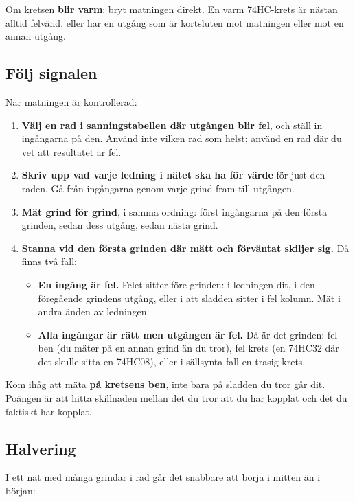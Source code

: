 \begin{warning}
Om kretsen \textbf{blir varm}: bryt matningen direkt. En varm 74HC-krets är nästan alltid felvänd,
eller har en utgång som är kortsluten mot matningen eller mot en annan utgång.
\end{warning}

\subsection{Följ signalen}
\label{c5:a4}
När matningen är kontrollerad:
\begin{enumerate}
  \item \textbf{Välj en rad i sanningstabellen där utgången blir fel}, och ställ in ingångarna på
    den. Använd inte vilken rad som helst; använd en rad där du vet att resultatet är fel.
  \item \textbf{Skriv upp vad varje ledning i nätet ska ha för värde} för just den raden. Gå från
    ingångarna genom varje grind fram till utgången.
  \item \textbf{Mät grind för grind}, i samma ordning: först ingångarna på den första grinden,
    sedan dess utgång, sedan nästa grind.
  \item \textbf{Stanna vid den första grinden där mätt och förväntat skiljer sig.} Då finns två
    fall:
    \begin{itemize}
      \item \textbf{En ingång är fel.} Felet sitter före grinden: i ledningen dit, i den
        föregående grindens utgång, eller i att sladden sitter i fel kolumn. Mät i andra änden av
        ledningen.
      \item \textbf{Alla ingångar är rätt men utgången är fel.} Då är det grinden: fel ben (du
        mäter på en annan grind än du tror), fel krets (en 74HC32 där det skulle sitta en
        74HC08), eller i sällsynta fall en trasig krets.
    \end{itemize}
\end{enumerate}

Kom ihåg att mäta \textbf{på kretsens ben}, inte bara på sladden du tror går dit. Poängen är att
hitta skillnaden mellan det du tror att du har kopplat och det du faktiskt har kopplat.

\subsection{Halvering}
\label{c5:a5}
I ett nät med många grindar i rad går det snabbare att börja i mitten än i början:

